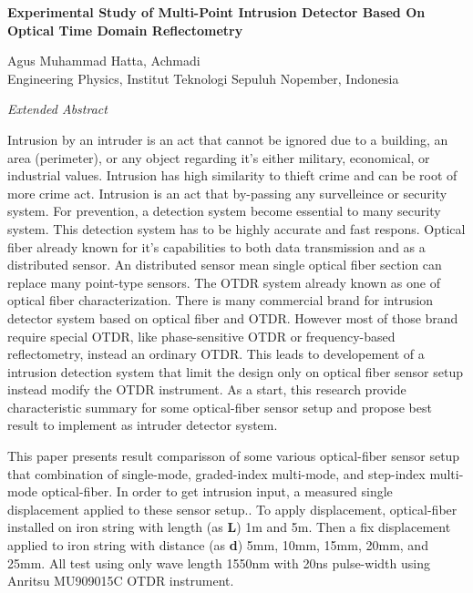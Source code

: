 \documentclass[a4paper,14pt]{article}
\date{}
\begin{document}
\begin{center}
	\textbf{Experimental Study of Multi-Point Intrusion Detector Based On Optical Time Domain Reflectometry}
\end{center}

\begin{center}
	Agus Muhammad Hatta, Achmadi \\
	Engineering Physics, Institut Teknologi Sepuluh Nopember, Indonesia
\end{center}

\begin{center}
	\textit{Extended Abstract}
\end{center}

Intrusion by an intruder is an act that cannot be ignored due to a building, an area (perimeter), or any object regarding it’s either military, economical, or industrial values.
Intrusion has high similarity to thieft crime and can be root of more crime act.
Intrusion is an act that by-passing any survelleince or security system.
For prevention, a detection system become essential to many security system.
This detection system has to be highly accurate and fast respons.
Optical fiber already known for it’s capabilities to both data transmission and as a distributed sensor.
An distributed sensor mean single optical fiber section can replace many point-type sensors.
The OTDR system already known as one of optical fiber characterization.
There is many commercial brand for intrusion detector system based on optical fiber and OTDR.
However most of those brand require special OTDR, like phase-sensitive OTDR or frequency-based reflectometry, instead an ordinary OTDR.
This leads to developement of a intrusion detection system that limit the design only on optical fiber sensor setup instead modify the OTDR instrument.
As a start, this research provide characteristic summary for some optical-fiber sensor setup and propose best result to implement as intruder detector system.

\hfill

This paper presents result comparisson of some various optical-fiber sensor setup that combination of single-mode, graded-index multi-mode, and step-index multi-mode optical-fiber.
In order to get intrusion input, a measured single displacement applied to these sensor setup.\cite{Pinto2006}.
To apply displacement, optical-fiber installed on iron string with length (as \textbf{L}) 1m and 5m.
Then a fix displacement applied to iron string with distance (as \textbf{d}) 5mm, 10mm, 15mm, 20mm, and 25mm.  
All test using only wave length 1550nm with 20ns pulse-width using Anritsu MU909015C OTDR instrument.\cite{Anritsu2010} 
\end{document}

